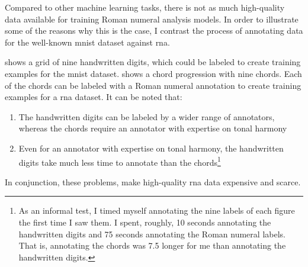 

Compared to other machine learning tasks, there is not as
much high-quality data available for training Roman numeral
analysis models. In order to illustrate some of the reasons
why this is the case, I contrast the process of annotating
data for the well-known \gls{mnist} dataset
\parencite{lecun1989handwritten} against \gls{rna}.


 shows a grid of nine handwritten digits,
which could be labeled to create training examples for the \gls{mnist} dataset.
 shows a chord progression with nine chords.
Each of the chords can be labeled with a Roman numeral
annotation to create training examples for a \gls{rna} dataset. It can be noted
that:

\begin{enumerate}
    \item The handwritten digits can be labeled by a wider
    range of annotators, whereas the chords require an annotator with expertise on tonal harmony
    \item Even for an annotator with expertise on tonal harmony, the handwritten digits take much less time to annotate than the chords\footnote{As an informal test, I timed myself annotating the nine labels of each figure the first time I saw them. I spent, roughly, 10 seconds annotating the handwritten digits and 75 seconds annotating the Roman numeral labels. That is, annotating the chords was 7.5 longer for me than annotating the handwritten digits.}
\end{enumerate}

In conjunction, these problems, make high-quality \gls{rna} data expensive and scarce.


